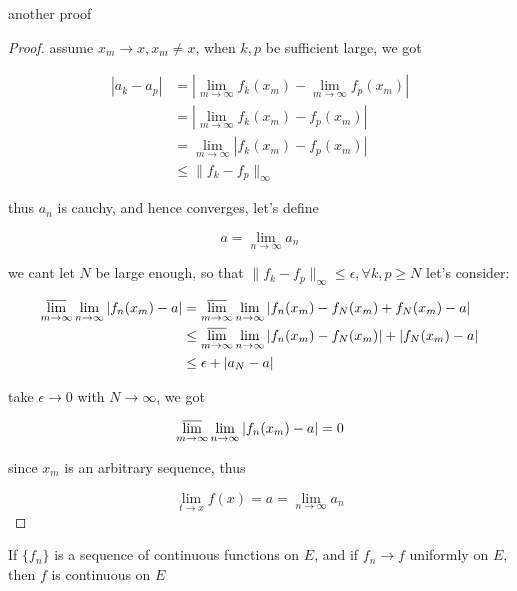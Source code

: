 \begin{corollary}
    another proof
\end{corollary}

\begin{proof}
    assume $x_m \to x, x_m \ne x$, when $k,p$ be sufficient large, we got

    \begin{align*}
        \left| a_k - a_p \right| &= \left|\lim_{m \to \infty}f_k(x_m)- \lim_{m \to \infty}f_p(x_m) \right| \\
        & =  \left|\lim_{m \to \infty}f_k(x_m)-f_p(x_m) \right| \\
        & =  \lim_{m \to \infty}\left|f_k(x_m)-f_p(x_m) \right| \\
        & \le \| f_k - f_p\|_\infty
    \end{align*}

    thus $a_n$ is cauchy, and hence converges, let's define

    \[
        a = \lim_{n \to \infty}a_n
    \]

    we cant let $N$ be large enough, so that $\| f_k  - f_p\|_\infty \le \epsilon, \forall k,p \ge N $ let's consider:

    \begin{align*}
        \varlimsup_{m \to \infty} \lim_{n \to \infty}\left|f_n(x_m) - a \right| &=\varlimsup_{m \to \infty} \lim_{n \to \infty}\left|f_n(x_m) - f_N(x_m) + f_N(x_m) -a \right| \\
        & \le \varlimsup_{m \to \infty} \lim_{n \to \infty}\left|f_n(x_m) - f_N(x_m)\right| + \left|f_N(x_m) -a \right| \\
        & \le \epsilon + \left| a_N -a \right|
    \end{align*}

    take $\epsilon \to 0$ with $N \to \infty$, we got

    \[
        \varlimsup_{m \to \infty} \lim_{n \to \infty}\left|f_n(x_m) - a \right| = 0
    \]

    since $x_m$ is an arbitrary sequence, thus

    \[
        \lim_{t \to x}f(x) = a = \lim_{n \to \infty}a_n
    \]
\end{proof}

\begin{corollary}
    \label{thm:uniform-convergence-reserve-continuity}
    If $\{ f_n \}$ is a sequence of continuous functions on $E$, and if $f_n \to f$
    uniformly on $E$, then $f$ is continuous on $E$
\end{corollary}


